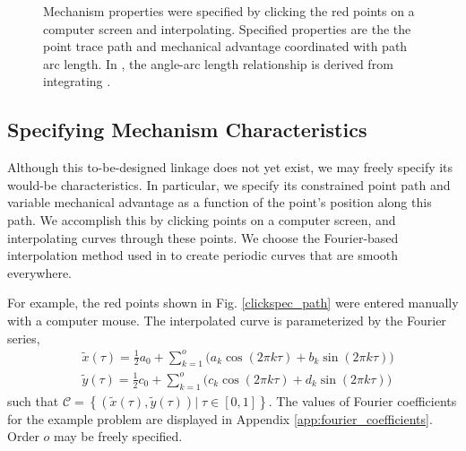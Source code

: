 \documentclass[journal]{IEEEtran}
\begin{document}
\begin{figure}[!b]
{\label{clickspec_angle}}
\caption{Mechanism properties were specified by clicking the red points on a computer screen and interpolating.  Specified properties are the \protect{} the point trace path and \protect{} mechanical advantage coordinated with path arc length.  In \protect{}, the angle-arc length relationship is derived from integrating \protect{}.}
\label{clickspec}
\end{figure}


\subsection{Specifying Mechanism Characteristics}
\label{sec:spec_mech_char}

Although this to-be-designed linkage does not yet exist, we may freely specify its would-be characteristics.  
In particular, we specify its constrained point path and variable mechanical advantage as a function of the point's position along this path.
We accomplish this by clicking points on a computer screen, and interpolating curves through these points.
We choose the Fourier-based interpolation method used in \cite{plecnikControllingMovementTRR2016} to create periodic curves that are smooth everywhere.



For example, the red points shown in Fig. \ref{clickspec_path} were entered manually with a computer mouse.  The interpolated curve is parameterized by the Fourier series,
\begin{align}
&\tilde{x}(\tau) = \tfrac{1}{2}a_0 + \textstyle\sum\limits_{k=1}^{o}\!\Big( a_k\cos (2\pi k\tau) + b_k\sin (2\pi k\tau) \Big) \nonumber\\[5pt]
&\tilde{y}(\tau) = \tfrac{1}{2}c_0 + \textstyle\sum\limits_{k=1}^{o}\!\Big( c_k\cos (2\pi k\tau) + d_k\sin (2\pi k\tau) \Big)
\label{fourier_interp_path}
\end{align}
such that $\mathcal{C} = \left\lbrace \left( \tilde{x}(\tau), \tilde{y}(\tau) \right) |\; \tau \in [0,1] \right\rbrace$.
The values of Fourier coefficients for the example problem are displayed in Appendix \ref{app:fourier_coefficients}.
Order $o$ may be freely specified.
\end{document}

